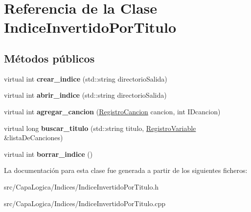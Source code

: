 \hypertarget{class_indice_invertido_por_titulo}{\section{\-Referencia de la \-Clase \-Indice\-Invertido\-Por\-Titulo}
\label{class_indice_invertido_por_titulo}
}
\subsection*{\-Métodos públicos}
\begin{DoxyCompactItemize}
\item 
\hypertarget{class_indice_invertido_por_titulo_a9f7ca062e18394ac228314c68b65e0ae}{virtual int {\bfseries crear\-\_\-indice} (std\-::string directorio\-Salida)}\label{class_indice_invertido_por_titulo_a9f7ca062e18394ac228314c68b65e0ae}

\item 
\hypertarget{class_indice_invertido_por_titulo_a5506629ee0e1d6cd937c4271e71b1355}{virtual int {\bfseries abrir\-\_\-indice} (std\-::string directorio\-Salida)}\label{class_indice_invertido_por_titulo_a5506629ee0e1d6cd937c4271e71b1355}

\item 
\hypertarget{class_indice_invertido_por_titulo_ae8101f3fa5d0dd459894abe5448853d7}{virtual int {\bfseries agregar\-\_\-cancion} (\hyperlink{class_registro_cancion}{\-Registro\-Cancion} cancion, int \-I\-Dcancion)}\label{class_indice_invertido_por_titulo_ae8101f3fa5d0dd459894abe5448853d7}

\item 
\hypertarget{class_indice_invertido_por_titulo_abd1af29908b68e96eb94c6fe6a296dc1}{virtual long {\bfseries buscar\-\_\-titulo} (std\-::string titulo, \hyperlink{class_registro_variable}{\-Registro\-Variable} \&lista\-De\-Canciones)}\label{class_indice_invertido_por_titulo_abd1af29908b68e96eb94c6fe6a296dc1}

\item 
\hypertarget{class_indice_invertido_por_titulo_a0222f514fe0abce3d95d2ba09c3cd91d}{virtual int {\bfseries borrar\-\_\-indice} ()}\label{class_indice_invertido_por_titulo_a0222f514fe0abce3d95d2ba09c3cd91d}

\end{DoxyCompactItemize}


\-La documentación para esta clase fue generada a partir de los siguientes ficheros\-:\begin{DoxyCompactItemize}
\item 
src/\-Capa\-Logica/\-Indices/\-Indice\-Invertido\-Por\-Titulo.\-h\item 
src/\-Capa\-Logica/\-Indices/\-Indice\-Invertido\-Por\-Titulo.\-cpp\end{DoxyCompactItemize}
